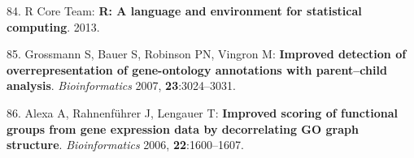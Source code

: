 \documentclass[]{article}
\begin{document}
84. R Core Team: \textbf{R: A language and environment for statistical
computing}. 2013.

85. Grossmann S, Bauer S, Robinson PN, Vingron M: \textbf{Improved
detection of overrepresentation of gene-ontology annotations with
parent--child analysis}. \emph{Bioinformatics} 2007,
\textbf{23}:3024--3031.

86. Alexa A, Rahnenf{ü}hrer J, Lengauer T: \textbf{Improved scoring of
functional groups from gene expression data by decorrelating GO graph
structure}. \emph{Bioinformatics} 2006, \textbf{22}:1600--1607.
\end{document}
